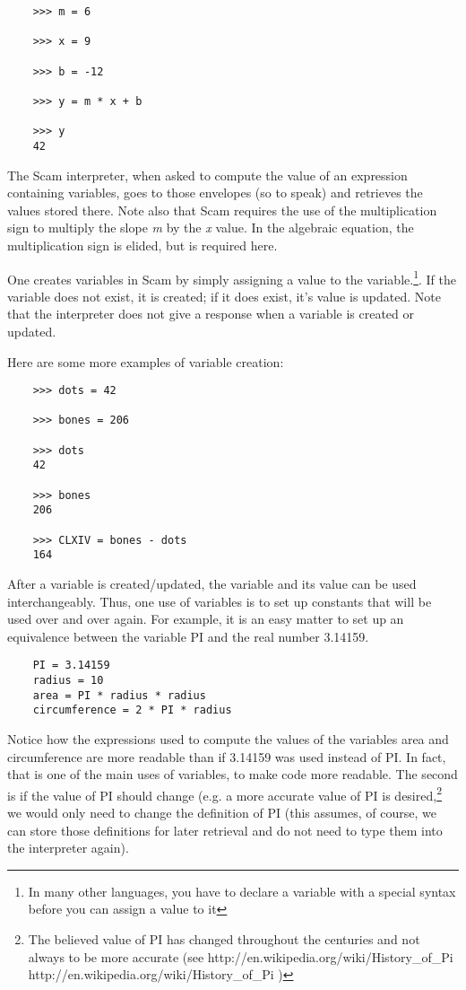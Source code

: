 \begin{verbatim}
    >>> m = 6
    
    >>> x = 9  
    
    >>> b = -12
    
    >>> y = m * x + b
    
    >>> y
    42
\end{verbatim}

The Scam interpreter,
when asked to compute the value of an expression containing variables,
goes to those envelopes (so to speak) and
retrieves the values stored there.
Note also that Scam
requires the use of the multiplication sign
to multiply the slope {\it m} by the {\it x} value.
In the algebraic equation,
the multiplication sign is elided,
but is required here.

One creates variables in Scam by simply assigning a value
to the variable.\footnote{
In many other languages, you have to declare a variable
with a special syntax before you can assign a value
to it}. If the variable does not exist, it is created;
if it does exist, it's value is updated.
Note that the interpreter does not give a response
when a variable is created or updated.

Here are some more examples of variable creation:

\begin{verbatim}
    >>> dots = 42

    >>> bones = 206

    >>> dots
    42

    >>> bones
    206

    >>> CLXIV = bones - dots
    164
\end{verbatim}

After a variable is created/updated,
the variable and its value can be used interchangeably.
Thus,
one use of variables is to set up constants that
will be used over and over again.
For example,
it is an easy matter to
set up an equivalence between the variable {\sf PI} and the real number 3.14159.

\begin{verbatim}
    PI = 3.14159
    radius = 10
    area = PI * radius * radius
    circumference = 2 * PI * radius
\end{verbatim}

Notice how the expressions used to compute the values of the variables
area and circumference are more readable than if 3.14159 was used
instead of {\sf PI}.
In fact,
that is one of the main uses of variables,
to
make code more readable.
The second is if the value of {\sf PI} should change
(e.g. a more accurate value of {\sf PI} is desired,\footnote{
The believed value of {\sf PI} has changed throughout the centuries and not
always to be more accurate (see
\xlink
{http://en.wikipedia.org/wiki/History\_of\_Pi}
{http://en.wikipedia.org/wiki/History\_of\_Pi}
)
}
we would only need
to change the definition of {\sf PI} (this assumes,
of course,
we can store
those definitions for later retrieval and do not need to type them into
the interpreter again).

